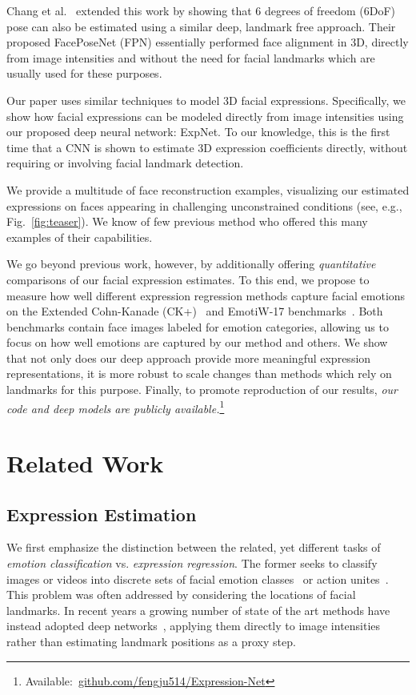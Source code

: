 \documentclass[a4paper, 10pt, conference]{ieeeconf}
\begin{document}
Chang et al.~\cite{chang17fpn} extended this work by showing that 6 degrees of freedom (6DoF) pose can also be estimated using a similar deep, landmark free approach. Their proposed FacePoseNet (FPN) essentially performed face alignment in 3D, directly from image intensities and without the need for facial landmarks which are usually used for these purposes. 

Our paper uses similar techniques to model 3D facial expressions. Specifically, we show how facial expressions can be modeled directly from image intensities using our proposed deep neural network: ExpNet. To our knowledge, this is the first time that a CNN is shown to estimate 3D expression coefficients directly, without requiring or involving facial landmark detection.


We provide a multitude of face reconstruction examples, visualizing our estimated expressions on faces appearing in challenging unconstrained conditions (see, e.g., Fig.~\ref{fig:teaser}). We know of few previous method who offered this many examples of their capabilities. 

We go beyond previous work, however, by additionally offering {\em quantitative} comparisons of our facial expression estimates. To this end, we propose to measure how well different expression regression methods capture facial emotions on the Extended Cohn-Kanade (CK+)~\cite{lucey2010extended} and EmotiW-17 benchmarks~\cite{dhall2017individual}. Both benchmarks contain face images labeled for emotion categories, allowing us to focus on how well emotions are captured by our method and others. We show that not only does our deep approach provide more meaningful expression representations, it is more robust to scale changes than methods which rely on landmarks for this purpose. Finally, to promote reproduction of our results, {\em our code and deep models are publicly available.}\footnote{Available:~\url{github.com/fengju514/Expression-Net}} 

 
\section{Related Work}\label{sec:relatedwork}
\subsection{Expression Estimation}
We first emphasize the distinction between the related, yet different tasks of {\em emotion classification} vs. {\em expression regression}. The former seeks to classify images or videos into discrete sets of facial emotion classes~\cite{dhall2017individual,lucey2010extended} or action unites~\cite{fabian2016emotionet,zafeiriou2016facial}. This problem was often addressed by considering the locations of facial landmarks. In recent years a growing number of state of the art methods have instead adopted deep networks~\cite{kosti2017emotion,levi2015emotion,zhang2016gender}, applying them directly to image intensities rather than estimating landmark positions as a proxy step.
\end{document}
